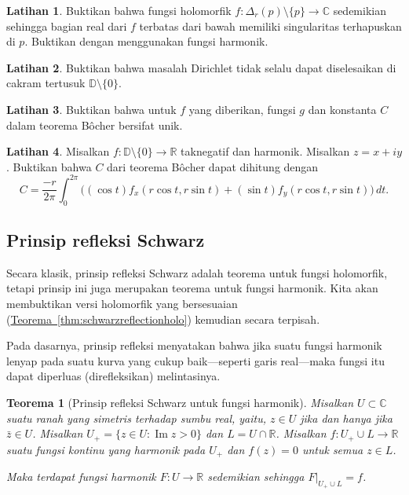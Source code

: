 \documentclass[12pt,openany]{book}
\renewcommand{\Im}{\operatorname{Im}}
\newcommand{\C}{{\mathbb{C}}}
\newcommand{\R}{{\mathbb{R}}}
\newcommand{\D}{{\mathbb{D}}}
\theoremstyle{plain}
\newtheorem{thm}{Teorema}[section]
\theoremstyle{remark}
\theoremstyle{definition}
\newenvironment{exbox}{%
    \def\FrameCommand{\vrule width 1pt \relax\hspace{10pt}}%
    \MakeFramed{\advance\hsize-\width\FrameRestore}%
}{%
    \endMakeFramed
}
\theoremstyle{exercise}
\newtheorem{exercise}{Latihan}[section]
\theoremstyle{example}
\newcommand{\thmref}[1]{\hyperref[#1]{Teorema~\ref*{#1}}}
\begin{document}
\begin{exbox}
\begin{exercise}
Buktikan bahwa fungsi holomorfik $f \colon \Delta_r(p) \setminus \{ p \} \to \C$
sedemikian sehingga bagian real dari $f$ terbatas dari bawah memiliki singularitas terhapuskan di $p$.
Buktikan dengan menggunakan fungsi harmonik.
\end{exercise}

\begin{exercise} \label{exercise:nodirichletsolpuncturedD}
Buktikan bahwa masalah Dirichlet tidak selalu dapat diselesaikan di cakram tertusuk $\D
\setminus \{ 0 \}$.
\end{exercise}

\begin{exercise}
Buktikan bahwa untuk $f$ yang diberikan, fungsi $g$ dan konstanta $C$ dalam 
teorema B\^{o}cher bersifat unik.
\end{exercise}

\begin{exercise}
Misalkan $f \colon \D \setminus \{ 0 \} \to \R$ taknegatif dan harmonik.
Misalkan $z=x+iy$.  Buktikan bahwa $C$ dari teorema B\^{o}cher dapat dihitung dengan
\begin{equation*}
C =  \frac{-r}{2\pi} \int_0^{2\pi}
\bigl(
(\cos t) f_x (r\cos t,r\sin t) +
(\sin t) f_y (r\cos t,r\sin t) 
\bigr) \, dt .
\end{equation*}
\end{exercise}
\end{exbox}

\subsection{Prinsip refleksi Schwarz}

Secara klasik, prinsip refleksi Schwarz adalah teorema untuk fungsi holomorfik,
tetapi prinsip ini juga merupakan teorema untuk fungsi harmonik.
Kita akan membuktikan versi holomorfik yang bersesuaian
(\thmref{thm:schwarzreflectionholo}) kemudian secara terpisah.

Pada dasarnya, prinsip refleksi menyatakan bahwa jika suatu fungsi harmonik lenyap pada suatu
kurva yang cukup baik---seperti garis real---maka fungsi itu dapat diperluas (direfleksikan) melintasinya.

\begin{thm}[Prinsip refleksi Schwarz untuk fungsi harmonik]%
%
\label{thm:schwarzreflectionharm}
Misalkan $U \subset \C$ suatu ranah yang simetris terhadap sumbu real, yaitu,
$z \in U$ jika dan hanya jika $\bar{z} \in U$.
Misalkan $U_+ = \{ z \in U : \Im z > 0 \}$ dan $L = U \cap \R$.
Misalkan $f \colon U_+ \cup L \to \R$ suatu fungsi kontinu yang
harmonik pada $U_+$ dan $f(z) = 0$ untuk semua $z \in L$.

Maka terdapat fungsi harmonik $F \colon U \to \R$ sedemikian sehingga
$F|_{U_+ \cup L} = f$.
\end{thm}
\end{document}
